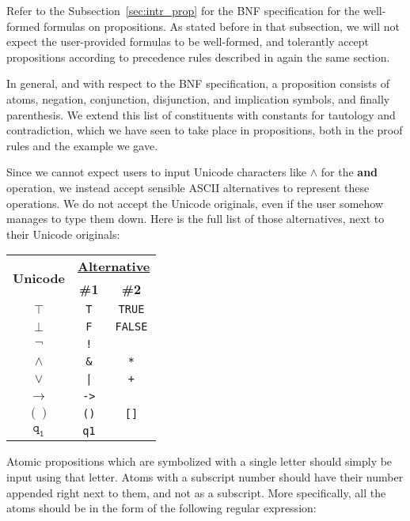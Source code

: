 \documentclass{article}
\newcommand{\imp}{\ensuremath{\rightarrow}}
\begin{document}
Refer to the Subsection~\ref{sec:intr_prop} for the BNF specification
for the well-formed formulas on propositions. As stated before
in that subsection, we will not expect the user-provided formulas
to be well-formed, and tolerantly accept propositions according
to precedence rules described in again the same section.

In general, and with respect to the BNF specification, a proposition
consists of atoms, negation, conjunction, disjunction, and implication
symbols, and finally parenthesis. We extend this list of constituents with
constants for tautology and contradiction, which we have seen to take
place in propositions, both in the proof rules and the example we gave.

Since we cannot expect users to input Unicode characters like $\land$
for the \textbf{and} operation, we instead accept sensible ASCII
alternatives to represent these operations. We do not accept the
Unicode originals, even if the user somehow manages to type them down.
Here is the full list of those alternatives, next to their Unicode
originals:

\begin{center}
	\begin{tabular}{c | c c}
		\multirow{2}{*}{\textbf{Unicode}} & \multicolumn{2}{c}{\textbf{\underline{Alternative}}}\\
		& \textbf{\#1} & \textbf{\#2}\\
		\hline
		$\mathtt{\top}$  & \verb|T|                & \verb|TRUE|\\
		$\mathtt{\bot}$  & \verb|F|                & \verb|FALSE|\\
		$\mathtt{\neg}$  & \verb|!|                & \\
		$\mathtt{\land}$ & \verb|&|                & \verb|*|\\
		$\mathtt{\lor}$  & \verb^|^                & \verb|+|\\
		$\mathtt{\imp}$  & \verb|->|               & \\
		$\mathtt{()}$    & \verb|()|               & \verb|[]|\\
		$\mathtt{q_1}$   & \verb|q1|               &
	\end{tabular}
\end{center}

Atomic propositions which are symbolized with a single letter should simply
be input using that letter. Atoms with a subscript number should have their
number appended right next to them, and not as a subscript. More specifically,
all the atoms should be in the form of the following regular expression:
\end{document}

